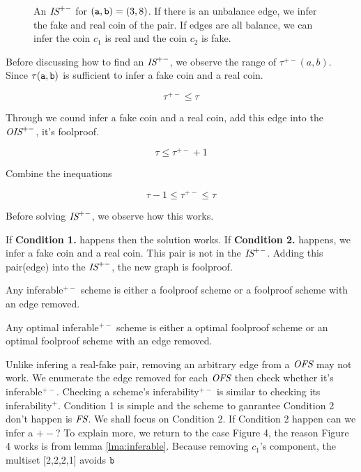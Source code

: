 \begin{figure}[!htb]
   \centering
     \vspace*{2.5ex}
    \caption{An $\text{\it IS}^{+-}$ for $(\mathtt{a},\mathtt{b})=(3,8)$. If there is an unbalance edge, we infer the fake and real coin of the pair. If edges are all balance, we can infer the coin $c_1$ is real and the coin $c_2$ is fake.}
\end{figure}

Before discussing how to find an $\text{\it IS}^{+-}$, we observe the range of $\tau^{+-}(a,b)$. Since $\tau(\mathtt{a},\mathtt{b})$ is sufficient to infer a fake coin and a real coin. 

\[
\tau^{+-} \leq \tau
\]

Through we cound infer a fake coin and a real coin, add this edge into the $\text{\it OIS}^{+-}$, it's foolproof.

\[
\tau \leq \tau^{+-}+1
\]

Combine the inequations

\[
\tau-1 \leq \tau^{+-} \leq \tau
\]


Before solving $\text{\it IS}^{+-}$, we observe how this works.

If \textbf{Condition 1.} happens then the solution works.
If \textbf{Condition 2.} happens, we infer a fake coin and a real coin. This pair is not in the $\text{\it IS}^{+-}$. Adding this pair(edge) into the $\text{\it IS}^{+-}$, the new graph is foolproof.

\begin{lemma}
Any inferable$^{+-}$ scheme is either a foolproof scheme or a foolproof scheme with an edge removed.
\end{lemma}

\begin{theorem}
Any optimal inferable$^{+-}$ scheme is either a optimal foolproof scheme or an optimal foolproof scheme with an edge removed.
\end{theorem}

Unlike infering a real-fake pair, removing an arbitrary edge from a $\text{\it OFS}$ may not work.
We enumerate the edge removed for each $\text{\it OFS}$ then check whether it's inferable$^{+-}$. 
Checking a scheme's inferability$^{+-}$ is similar to checking its inferability$^+$. Condition 1 is simple and the scheme to ganrantee Condition 2 don't happen is $\text{\it FS}$. We shall focus on Condition 2. If Condition 2 happen can we infer a $+-$? To explain more, we return to the case Figure 4, the reason Figure 4 works is from lemma \ref{lma:inferable}. Because removing $c_1$'s component, the multiset [2,2,2,1] avoids $\mathtt{b}$